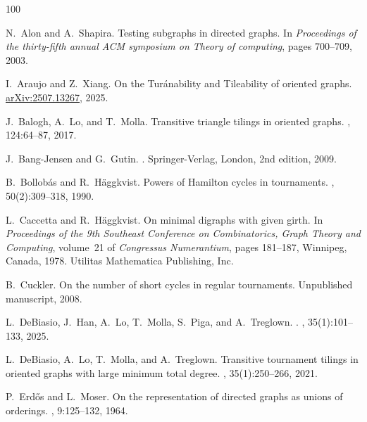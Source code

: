 \documentclass[11pt,a4paper,reqno]{amsart}
\theoremstyle{definition} %
\begin{document}

\begin{thebibliography}{100}
	
	N.~Alon and A.~Shapira.
	\newblock Testing subgraphs in directed graphs.
	\newblock In {\em Proceedings of the thirty-fifth annual ACM symposium on
		Theory of computing}, pages 700--709, 2003.
	
	I.~Araujo and Z.~Xiang.
	\newblock On the {T}ur\'anability and {T}ileability of oriented graphs.
	\newblock \url{arXiv:2507.13267}, 2025.
	
	J.~Balogh, A.~Lo, and T.~Molla.
	\newblock Transitive triangle tilings in oriented graphs.
	, 124:64--87, 2017.
	
	J.~Bang-Jensen and G.~Gutin.
	.
	\newblock Springer-Verlag, London, 2nd edition, 2009.
	
	B.~Bollob\'as and R.~H\"aggkvist.
	\newblock Powers of {H}amilton cycles in tournaments.
	, 50(2):309--318, 1990.
	
	L.~Caccetta and R.~H{\"a}ggkvist.
	\newblock On minimal digraphs with given girth.
	\newblock In {\em Proceedings of the 9th Southeast Conference on Combinatorics,
		Graph Theory and Computing}, volume~21 of {\em Congressus Numerantium}, pages
	181--187, Winnipeg, Canada, 1978. Utilitas Mathematica Publishing, Inc.
	
	B.~Cuckler.
	\newblock On the number of short cycles in regular tournaments.
	\newblock Unpublished manuscript, 2008.
	
	L.~DeBiasio, J.~Han, A.~Lo, T.~Molla, S.~Piga, and A.~Treglown.
	.
	, 35(1):101--133, 2025.
	
	L.~DeBiasio, A.~Lo, T.~Molla, and A.~Treglown.
	\newblock Transitive tournament tilings in oriented graphs with large minimum
	total degree.
	, 35(1):250--266, 2021.
	
	P.~Erd{\H{o}}s and L.~Moser.
	\newblock On the representation of directed graphs as unions of orderings.
	, 9:125--132, 1964.
	

\end{thebibliography}
\end{document}
